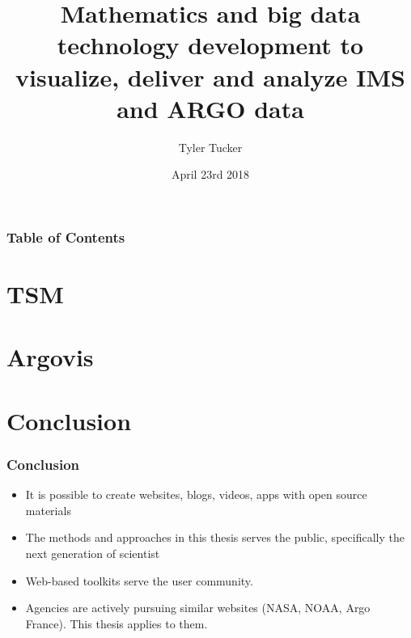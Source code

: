 \documentclass[hyperref={bookmarks=false},aspectratio=169]{beamer}
\title[IMS and ARGO data visualization and delivery]
{\bfseries{Mathematics and big data technology development to visualize, deliver and analyze IMS and ARGO data}}
\author{Tyler Tucker}
\institute{San Diego State University}
\date{April 23rd 2018}
\begin{document}
\titlepage  %

\begin{frame}
\frametitle{Table of Contents}
\tableofcontents
\end{frame}



\section{TSM}


\section{Argovis}


\section{Conclusion}

\begin{frame}
\frametitle{Conclusion}
\begin{itemize}
    \item It is possible to create websites, blogs, videos, apps with open source materials
    \item The methods and approaches in this thesis serves the public, specifically the next generation of scientist
    \item Web-based toolkits serve the user community.
    \item Agencies are actively pursuing similar websites (NASA, NOAA, Argo France). This thesis applies to them.
    
\end{itemize}
\end{frame}
\end{document}
